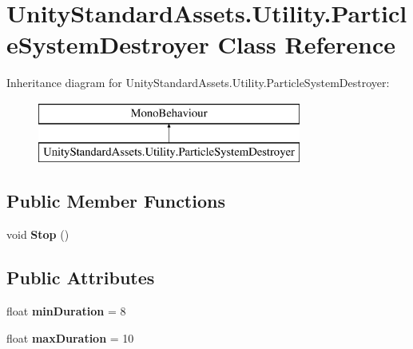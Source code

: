 \hypertarget{class_unity_standard_assets_1_1_utility_1_1_particle_system_destroyer}{}\section{Unity\+Standard\+Assets.\+Utility.\+Particle\+System\+Destroyer Class Reference}
\label{class_unity_standard_assets_1_1_utility_1_1_particle_system_destroyer}
Inheritance diagram for Unity\+Standard\+Assets.\+Utility.\+Particle\+System\+Destroyer\+:\begin{figure}[H]
\begin{center}
\leavevmode
\includegraphics[height=2.000000cm]{class_unity_standard_assets_1_1_utility_1_1_particle_system_destroyer}
\end{center}
\end{figure}
\subsection*{Public Member Functions}
\begin{DoxyCompactItemize}
\item 
\mbox{\label{class_unity_standard_assets_1_1_utility_1_1_particle_system_destroyer_ab6c9ecc82e2626fbd5b6d14d219a0935}} 
void {\bfseries Stop} ()
\end{DoxyCompactItemize}
\subsection*{Public Attributes}
\begin{DoxyCompactItemize}
\item 
\mbox{\label{class_unity_standard_assets_1_1_utility_1_1_particle_system_destroyer_aa3a334590fac10160cfead516a72e25b}} 
float {\bfseries min\+Duration} = 8
\item 
\mbox{\label{class_unity_standard_assets_1_1_utility_1_1_particle_system_destroyer_a8cfb6e6979b64567e06ab8da46415793}} 
float {\bfseries max\+Duration} = 10
\end{DoxyCompactItemize}
